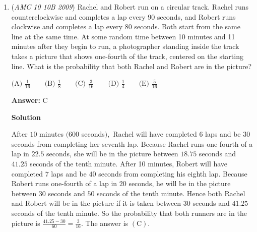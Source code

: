 \begin{enumerate}
 Because $\triangle NRQ \sim \triangle RTQ$, the ratio of the \textbf{Hypotenuse} to the \textbf{Long Leg} must be identical in both triangles:
 \[\frac{QR}{NR} = \frac{QT}{RT} \implies \frac{2}{NR} = \frac{2\sqrt{5}}{4}\]

 Flipping the proportion yields:
 \[\frac{NR}{2} = \frac{4}{2\sqrt{5}} \implies NR = \frac{4}{\sqrt{5}}\]

 Applying the Pythagorean Theorem on $\triangle NRQ$ to isolate the short leg $NQ$:
 \[NQ = \sqrt{QR^2 - NR^2} = \sqrt{2^2 - \left(\frac{4}{\sqrt{5}}\right)^2} = \sqrt{4 - \frac{16}{5}} = \sqrt{\frac{4}{5}} = \frac{2}{\sqrt{5}}\]

 We can now evaluate the area of triangle $B$ ($\triangle NRQ$):
 \[[NRQ] = \frac{1}{2} \cdot NR \cdot NQ = \frac{1}{2} \cdot \frac{4}{\sqrt{5}} \cdot \frac{2}{\sqrt{5}} = \frac{4}{5}\]

 Since the cake has a height of $2$ inches, the piece contains $c = 2[NRQ] = \frac{8}{5}$ cubic inches of cake. The icing covers the top face and the outer $2 \times 2$ vertical wall, giving $s = [NRQ] + 4 = \frac{24}{5}$ square inches of icing. 

 Evaluating the final target sum $c + s$:
 \[3\left(\frac{4}{5}\right) + 4 = \frac{12}{5} + \frac{20}{5} = \boxed{\text{(B) } \frac{32}{5}}\]



	\item (\textit{AMC 10 10B 2009}) Rachel and Robert run on a circular track.  Rachel runs counterclockwise and completes a lap every 90 seconds, and Robert runs clockwise and completes a lap every 80 seconds.  Both start from the same line at the same time.  At some random time between 10 minutes and 11 minutes after they begin to run, a photographer standing inside the track takes a picture that shows one-fourth of the track, centered on the starting line.  What is the probability that both Rachel and Robert are in the picture?


 $\text{(A) } \frac 1{16} \qquad \text{(B) } \frac 18 \qquad \text{(C) } \frac 3{16} \qquad \text{(D) } \frac 14 \qquad \text{(E) } \frac 5{16}$

 \textbf{Answer: }C



\textbf{Solution}

After $10$ minutes $(600$ seconds$),$ Rachel will have completed $6$ laps and be $30$ seconds from completing her seventh lap. Because Rachel runs one-fourth of a lap in $22.5$ seconds, she will be in the picture between $18.75$ seconds and $41.25$ seconds of the tenth minute.  After 10 minutes, Robert will have completed $7$ laps and be $40$ seconds from completing his eighth lap.  Because Robert runs one-fourth of a lap in $20$ seconds, he will be in the picture between $30$ seconds and $50$ seconds of the tenth minute.  Hence both Rachel and Robert will be in the picture if it is taken between $30$ seconds and $41.25$ seconds of the tenth minute.  So the probability that both runners are in the picture is $\frac {41.25 - 30} {60} = \boxed{\frac {3}{16}}$.  The answer is $\mathrm{(C)}$.


\end{enumerate}
